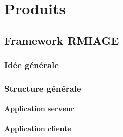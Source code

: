 \section{Produits}
\subsection{Framework RMIAGE}
\subsubsection{Idée générale}
\subsubsection{Structure générale}
\paragraph{Application serveur}
\paragraph{Application cliente}